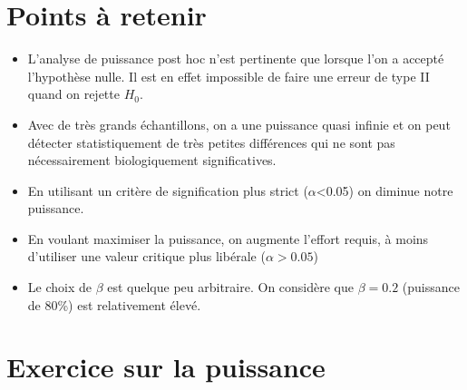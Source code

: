 \documentclass[12pt,]{book}
\providecommand{\tightlist}{%
  \setlength{\itemsep}{0pt}\setlength{\parskip}{0pt}}
\begin{document}
\hypertarget{points-uxe0-retenir}{%
\section{Points à retenir}\label{points-uxe0-retenir}}

\begin{itemize}
\tightlist
\item
  L'analyse de puissance post hoc n'est pertinente que lorsque l'on a accepté l'hypothèse nulle.
  Il est en effet impossible de faire une erreur de type II quand on rejette \(H_0\).
\item
  Avec de très grands échantillons, on a une puissance quasi infinie et on peut détecter statistiquement de très petites différences qui ne sont pas nécessairement biologiquement significatives.
\item
  En utilisant un critère de signification plus strict (\(\alpha\)\textless{}0.05) on diminue notre puissance.
\item
  En voulant maximiser la puissance, on augmente l'effort requis, à moins d'utiliser une valeur critique plus libérale (\(\alpha>0.05\))
\item
  Le choix de \(\beta\) est quelque peu arbitraire.
  On considère que \(\beta=0.2\) (puissance de 80\%) est relativement élevé.
\end{itemize}

\hypertarget{exercice-sur-la-puissance}{%
\section{Exercice sur la puissance}\label{exercice-sur-la-puissance}}
\end{document}
